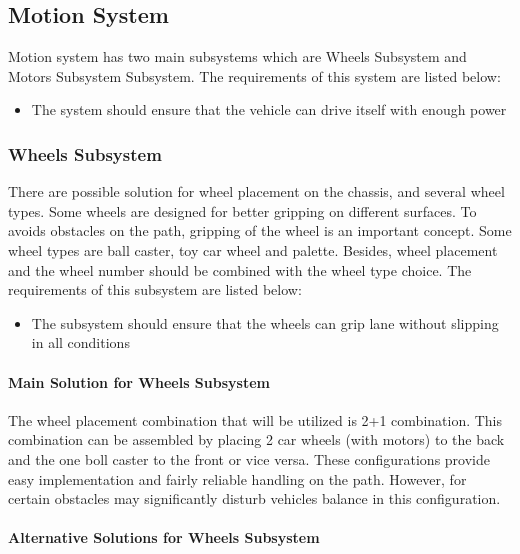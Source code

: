 \documentclass[a4paper,12pt]{article}
\begin{document}
	
	\subsection{Motion System}
	
	Motion system has two main subsystems which are Wheels Subsystem and Motors Subsystem Subsystem. The requirements of this system are listed below:
	\begin{itemize}
		\item The system should	ensure that the vehicle can drive itself with enough power
	\end{itemize}
	
	
	
	\subsubsection{Wheels Subsystem}
	There are possible solution for wheel placement on the chassis, and several wheel types. Some wheels are designed for better gripping on different surfaces. To avoids obstacles on the path, gripping of the wheel is an important concept. Some wheel types are ball caster, toy car wheel and palette. Besides, wheel placement and the wheel number should be combined with the wheel type choice. The requirements of this subsystem are listed below:
	\begin{itemize}
		\item The subsystem should ensure that the wheels can grip lane without slipping in all conditions 	
	\end{itemize}
	
	\paragraph{Main Solution for Wheels Subsystem}
	
	The wheel placement combination that will be utilized is 2+1 combination. This combination can be assembled by placing 2 car wheels (with motors) to the back and the one boll caster to the front or vice versa. These configurations provide easy implementation and fairly reliable handling on the path. However, for certain obstacles may significantly disturb vehicles balance in this configuration.\\
	
	\paragraph{Alternative Solutions for Wheels Subsystem}
	
\end{document}
